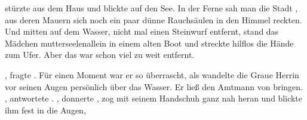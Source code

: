 \begin{Large}
{\Spaltfuss} stürzte aus dem Haus und blickte auf den See. In der Ferne sah man die Stadt {\Tern}, aus deren Mauern sich noch ein paar dünne Rauchsäulen in den Himmel reckten. Und mitten auf dem Wasser, nicht mal einen Steinwurf entfernt, stand das Mädchen mutterseelenallein in einem alten Boot und streckte hilflos die Hände zum Ufer. Aber das war schon viel zu weit entfernt.

, fragte {\Spaltfuss}. Für einen Moment war er so überrascht, als wandelte die Graue Herrin vor seinen Augen persönlich über das Wasser. Er ließ den Amtmann von {\Berna} bringen. , antwortete {\Nox}. , donnerte {\Spaltfuss} , {\Spaltfuss} zog {\Nox} mit seinem Handschuh ganz nah heran und blickte ihm fest in die Augen, 


\end{Large}


